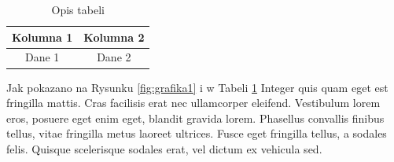 \documentclass{article}
\begin{document}
\begin{table}[h]
\centering
\begin{tabular}{|c|c|}
\hline
Kolumna 1 & Kolumna 2 \\
\hline
Dane 1 & Dane 2 \\
\hline
\end{tabular}
\caption{Opis tabeli}
\label{tab:tabela1}
\end{table}

Jak pokazano na Rysunku \ref{fig:grafika1} i w Tabeli \ref{tab:tabela1} Integer quis quam eget est fringilla mattis. Cras facilisis erat nec ullamcorper eleifend. Vestibulum lorem eros, posuere eget enim eget, blandit gravida lorem. Phasellus convallis finibus tellus, vitae fringilla metus laoreet ultrices. Fusce eget fringilla tellus, a sodales felis. Quisque scelerisque sodales erat, vel dictum ex vehicula sed.

\newpage










\end{document}
